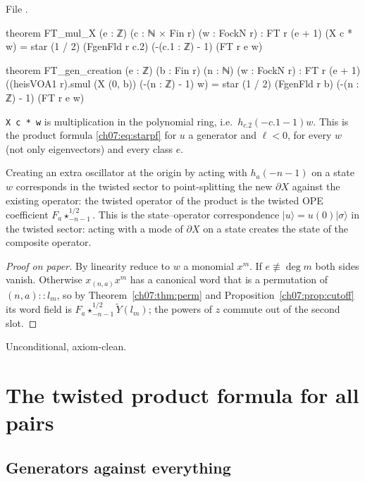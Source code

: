 \noindent File .
\begin{leancode}
theorem FT_mul_X (e : ℤ) (c : ℕ × Fin r) (w : FockN r) :
    FT r (e + 1) (X c * w) = star (1 / 2) (FgenFld r c.2) (-(c.1 : ℤ) - 1) (FT r e w)

theorem FT_gen_creation (e : ℤ) (b : Fin r) (n : ℕ) (w : FockN r) :
    FT r (e + 1) ((heisVOA1 r).smul (X (0, b)) (-(n : ℤ) - 1) w)
      = star (1 / 2) (FgenFld r b) (-(n : ℤ) - 1) (FT r e w)
\end{leancode}

\begin{dictionary}
\verb|X c * w| is multiplication in the polynomial ring, i.e.\ $h_{c.2}(-c.1-1)w$. This is the
product formula \eqref{ch07:eq:starpf} for $u$ a generator and $\ell<0$, for every $w$ (not only
eigenvectors) and every class $e$.
\end{dictionary}

\begin{physics}
Creating an extra oscillator at the origin by acting with $h_a(-n-1)$ on a state $w$ corresponds in the twisted sector to point-splitting the new $\partial X$ against the existing operator: the twisted operator of the product is the twisted OPE coefficient $F_a\star^{1/2}_{-n-1}$. This is the state--operator correspondence $|u\rangle=u(0)|\sigma\rangle$ in the twisted sector: acting with a mode of $\partial X$ on a state creates the state of the composite operator.
\end{physics}

\begin{proof}[Proof on paper]
By linearity reduce to $w$ a monomial $x^m$. If $e\not\equiv\deg m$ both sides vanish. Otherwise
$x_{(n,a)}x^m$ has a canonical word that is a permutation of $(n,a)::l_m$, so by
Theorem~\ref{ch07:thm:perm} and Proposition~\ref{ch07:prop:cutoff} its word field is
$F_a\star^{1/2}_{-n-1}\widetilde Y(l_m)$; the powers of $z$ commute out of the second slot.
\end{proof}

\begin{status}
Unconditional, axiom-clean.
\end{status}

\section{The twisted product formula for all pairs}\label{ch07:sec:pf}

\subsection{Generators against everything}

